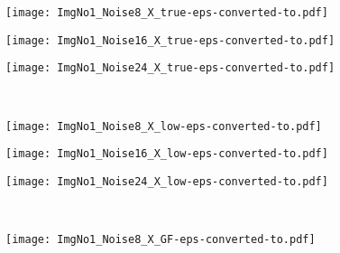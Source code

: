 \documentclass{article}
\begin{document}
\begin{figure*}[th]
	\begin{multicols}{2}  
		\centering
		\begin{minipage}[b]{0.1\linewidth}
		\end{minipage} 
		\begin{minipage}[b]{0.28\linewidth}
			\centering
			\texttt{[image: ImgNo1\_Noise8\_X\_true-eps-converted-to.pdf]}
		\end{minipage} 
		\begin{minipage}[b]{0.28\linewidth}
			\centering
			\texttt{[image: ImgNo1\_Noise16\_X\_true-eps-converted-to.pdf]}
		\end{minipage} 
		\begin{minipage}[b]{0.28\linewidth}
			\centering
			\texttt{[image: ImgNo1\_Noise24\_X\_true-eps-converted-to.pdf]}
		\end{minipage} 
		\\
		\begin{minipage}[b]{0.1\linewidth}
		\end{minipage} 
		\begin{minipage}[b]{0.28\linewidth}
			\centering
			\texttt{[image: ImgNo1\_Noise8\_X\_low-eps-converted-to.pdf]}
		\end{minipage} 
		\begin{minipage}[b]{0.28\linewidth}
			\centering
			\texttt{[image: ImgNo1\_Noise16\_X\_low-eps-converted-to.pdf]}
		\end{minipage} 
		\begin{minipage}[b]{0.28\linewidth}
			\centering
			\texttt{[image: ImgNo1\_Noise24\_X\_low-eps-converted-to.pdf]}
		\end{minipage} 
		\\
		\begin{minipage}[b]{0.1\linewidth}
		\end{minipage}  
		\begin{minipage}[b]{0.28\linewidth}
			\centering
			\texttt{[image: ImgNo1\_Noise8\_X\_GF-eps-converted-to.pdf]}

\end{minipage}
\end{multicols}
\end{figure*}
\end{document}
